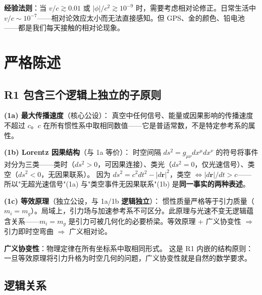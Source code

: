 \textbf{经验法则}：当 $v/c \gtrsim 0.01$ 或 $|\phi|/c^2 \gtrsim 10^{-9}$ 时，需要考虑相对论修正。日常生活中 $v/c \sim 10^{-7}$——相对论效应太小而无法直接感知。但 GPS、金的颜色、铅电池——都是我们每天接触的相对论现象。

\section{严格陈述}

\subsection{R1 包含三个逻辑上独立的子原则}

\begin{principlebox}[R1 — 因果时空结构]
  \textbf{(1a)  最大传播速度}（核心公设）：
  真空中任何信号、能量或因果影响的传播速度不超过 $c$。$c$ 在所有惯性系中取相同数值——它是普适常数，不是特定参考系的属性。

  \textbf{(1b)  Lorentz 因果结构}（与 1a 等价）：
  时空间隔 $ds^2 = g_{\mu\nu}dx^\mu dx^\nu$ 的符号将事件对分为三类——类时（$ds^2 > 0$，可因果连接）、类光（$ds^2 = 0$，仅光速信号）、类空（$ds^2 < 0$，无因果联系）。
  因为 $ds^2 = c^2dt^2 - |d\mathbf{r}|^2$，类空 $\iff |d\mathbf{r}|/dt > c$——所以"无超光速信号"(1a) 与"类空事件无因果联系"(1b) 是\textbf{同一事实的两种表述}。

  \textbf{(1c)  等效原理}（独立公设，与 1a/1b \textbf{逻辑独立}）：
  惯性质量严格等于引力质量（$m_i = m_g$）。局域上，引力场与加速参考系不可区分。此原理与光速不变无逻辑蕴含关系——$m_i=m_g$ 是引力可被几何化的必要桥梁。等效原理 + 广义协变性 $\Rightarrow$ 引力即时空弯曲 $\Rightarrow$ 广义相对论。

  \textbf{广义协变性}：物理定律在所有坐标系中取相同形式。
  这是 R1 内嵌的结构原则：一旦等效原理将引力升格为时空几何的问题，广义协变性就是自然的数学要求。
\end{principlebox}

\subsection{逻辑关系}

\begin{center}
\end{center}

